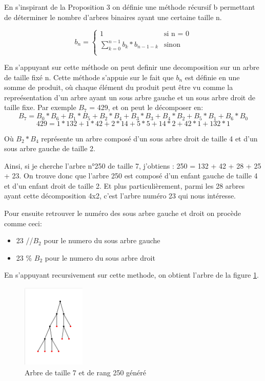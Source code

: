 \documentclass[french]{article}
\begin{document}
En s'inspirant de la Proposition 3 on définie une méthode récursif b permettant de déterminer le nombre d'arbres binaires ayant une certaine taille n.

\begin{equation}
    b_n =
    \begin{cases}
        1 & \text{si n = 0}\\
        \sum_{k=0}^{n-1}b_k*b_{n-1-k}  & \text{sinon}\\
    \end{cases}      
\end{equation}

En s'appuyant sur cette méthode on peut definir une decomposition sur un arbre de taille fixé n. Cette méthode s'appuie sur le fait que \(b_n\) est définie en une somme de produit, où chaque élément du produit peut être vu comme la repreésentation d'un arbre ayant un sous arbre gauche et un sous arbre droit de taille fixe. Par exemple \(B_7\) = 429, et on peut le décomposer en:
\[B_7=B_0*B_6+B_1*B_5+B_2*B_4+B_3*B_3+B_4*B_2+B_5*B_1+B_6*B_0\]
\[429=1*132+1*42+2*14+5*5+14*2+42*1+132*1\]

Où \(B_2*B_4\) représente un arbre composé d'un sous arbre droit de taille 4 et d'un sous arbre gauche de taille 2.

Ainsi, si je cherche l'arbre n\si{\degree}250 de taille 7, j'obtiens : 250 = 132 + 42 + 28 + 25 + 23. On trouve donc que l'arbre 250 est composé d'un enfant gauche de taille 4 et d'un enfant droit de taille 2. Et plus particulièrement, parmi les 28 arbres ayant cette décomposition 4x2, c'est l'arbre numéro 23 qui nous intéresse.


Pour ensuite retrouver le numéro des sous arbre gauche et droit on procède comme ceci:
\begin{itemize}
    \item 23 //\( B_2 \) pour le numero du sous arbre gauche
    \item 23 \% \(B_2\)   pour le numero du sous arbre droit
\end{itemize}

En s'appuyant recursivement sur cette methode, on obtient l'arbre de la figure \ref{fig:generation d'arbre}.

\begin{figure}[htp]
    \centering
    \includegraphics[width=3cm, height=4cm]{tree generation.png}
    \caption{Arbre de taille 7 et de rang 250 généré}
    \label{fig:generation d'arbre}
\end{figure}
\end{document}
